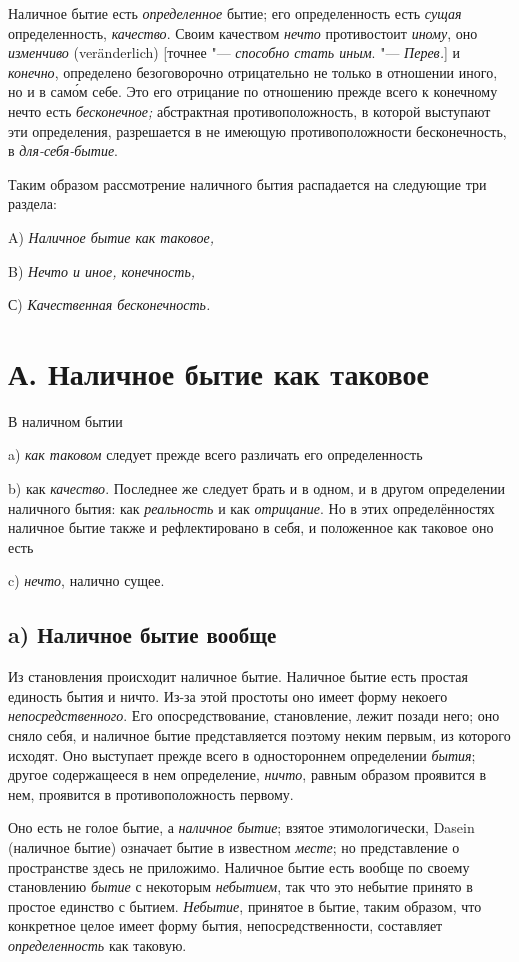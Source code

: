Наличное бытие есть {\em определенное} бытие; его
определенность есть {\em сущая} определенность,
{\em качество}. Своим качеством {\em нечто} противостоит
{\em иному}, оно {\em изменчиво}
(veränderlich) [точнее "--- {\em способно стать иным}. "---
{\em Перев.}] и {\em конечно},
определено безоговорочно отрицательно не только в отношении
иного, но и в сам\'{о}м себе. Это его отрицание по отношению прежде всего к
конечному нечто есть {\em бесконечное;} абстрактная
противоположность, в которой выступают эти определения, разрешается в не
имеющую противоположности бесконечность, в {\em для-себя-бытие}.

Таким образом рассмотрение наличного бытия распадается на следующие три
раздела:

A) {\em Наличное бытие как таковое,}

B) {\em Нечто и иное, конечность,}

С) {\em Качественная бесконечность.}

\section[А. Наличное бытие как таковое]{А. Наличное бытие как таковое}
В наличном бытии

a) {\em как таковом} следует прежде всего различать его определенность

b) как {\em качество}. Последнее же следует брать и в
одном, и в другом определении наличного бытия: как {\em реальность} и как
{\em отрицание}. Но в этих определённостях наличное
бытие также и рефлектировано в себя, и положенное как таковое оно есть

c) {\em нечто}, налично сущее.

\subsection[a) Наличное бытие вообще]{a) Наличное бытие вообще}
Из становления происходит наличное бытие. Наличное бытие есть простая
единость бытия и ничто. Из-за этой простоты оно имеет форму некоего
{\em непосредственного}. Его опосредствование,
становление, лежит позади него; оно сняло себя, и наличное бытие
представляется поэтому неким первым, из которого исходят. Оно выступает
прежде всего в одностороннем определении {\em бытия};
другое содержащееся в нем определение, {\em ничто},
равным образом проявится в нем, проявится в противоположность первому.

Оно есть не голое бытие, а {\em наличное бытие}; взятое
этимологически, Dasein (наличное бытие) означает бытие в известном
{\em месте}; но представление о пространстве здесь не
приложимо. Наличное бытие есть вообще по своему становлению
{\em бытие} с некоторым
{\em небытием}, так что это небытие принято в простое
единство с бытием. {\em Небытие}, принятое в бытие,
таким образом, что конкретное целое имеет форму бытия, непосредственности,
составляет {\em определенность} как таковую.

